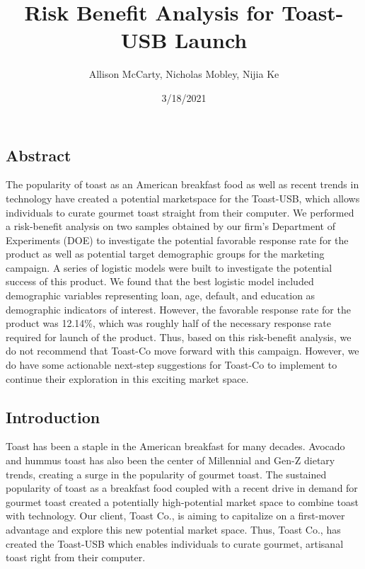 \documentclass[]{article}
\title{Risk Benefit Analysis for Toast-USB Launch}
\author{Allison McCarty, Nicholas Mobley, Nijia Ke}
\date{3/18/2021}
\begin{document}
\maketitle

\hypertarget{abstract}{%
\subsection{Abstract}\label{abstract}}

The popularity of toast as an American breakfast food as well as recent
trends in technology have created a potential marketspace for the
Toast-USB, which allows individuals to curate gourmet toast straight
from their computer. We performed a risk-benefit analysis on two samples
obtained by our firm's Department of Experiments (DOE) to investigate
the potential favorable response rate for the product as well as
potential target demographic groups for the marketing campaign. A series
of logistic models were built to investigate the potential success of
this product. We found that the best logistic model included demographic
variables representing loan, age, default, and education as demographic
indicators of interest. However, the favorable response rate for the
product was 12.14\%, which was roughly half of the necessary response
rate required for launch of the product. Thus, based on this
risk-benefit analysis, we do not recommend that Toast-Co move forward
with this campaign. However, we do have some actionable next-step
suggestions for Toast-Co to implement to continue their exploration in
this exciting market space.

\hypertarget{introduction}{%
\subsection{Introduction}\label{introduction}}

Toast has been a staple in the American breakfast for many decades.
Avocado and hummus toast has also been the center of Millennial and
Gen-Z dietary trends, creating a surge in the popularity of gourmet
toast. The sustained popularity of toast as a breakfast food coupled
with a recent drive in demand for gourmet toast created a potentially
high-potential market space to combine toast with technology. Our
client, Toast Co., is aiming to capitalize on a first-mover advantage
and explore this new potential market space. Thus, Toast Co., has
created the Toast-USB which enables individuals to curate gourmet,
artisanal toast right from their computer.
\end{document}
